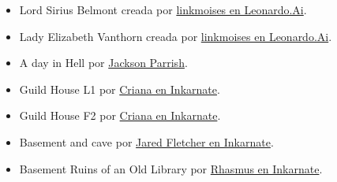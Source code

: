 \documentclass[10pt,twoside,twocolumn,openany]{dndbook}
\begin{document}
\begin{itemize}
  \item Lord Sirius Belmont creada por \href{https://cdn.leonardo.ai/users/898407a5-5b36-4dae-87cc-c51a8041e826/generations/8ac651a0-9be3-4896-85f0-2ce0d8e01215/DreamShaper_v7_dungeon_and_dragons_style_illustration_charisma_1.jpg}{linkmoises en Leonardo.Ai}.
  \item Lady Elizabeth Vanthorn creada por \href{https://cdn.leonardo.ai/users/898407a5-5b36-4dae-87cc-c51a8041e826/generations/a5c78c2e-61f0-478a-8005-03b46068bcdc/DreamShaper_v7_dungeon_and_dragons_style_illustration_charisma_1.jpg}{linkmoises en Leonardo.Ai}.
  \item A day in Hell por \href{https://licensing.pixels.com/featured/a-day-in-hell-jackson-parrish.html}{Jackson Parrish}.
  \item Guild House L1 por \href{https://inkarnate.com/p/RVAA0X-criana/maps/79j1zW-guild-house/}{Criana en Inkarnate}.
  \item Guild House F2 por \href{https://inkarnate.com/p/RVAA0X-criana/maps/lZznw8-guild-house-f2/}{Criana en Inkarnate}.
  \item Basement and cave por \href{https://inkarnate.com/p/49vmYo-jared-fletcher/maps/kdGk9r-basement-and-cave/}{Jared Fletcher en Inkarnate}.
  \item Basement Ruins of an Old Library por \href{https://inkarnate.com/p/R1zAY7-rhasmus/maps/lJ1wxd-day-89-365-basement-ruins-of-an-old-library/}{Rhasmus en Inkarnate}.
\end{itemize}
\end{document}
